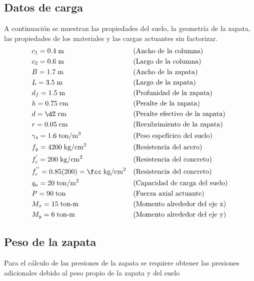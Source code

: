 \documentclass[11pt,a4paper,fleqn]{article}
\begin{document}
\subsection{Datos de carga}
A continuación se muestran las propiedades del suelo, la geometría de la zapata, las propiedades de los materiales y las cargas actuantes sin factorizar.
\begin{align*}
	&c_1=       \caZ    \text{\;m}                && \text{(Ancho de la columna)}\\
	&c_2=       \cbZ    \text{\;m}                && \text{(Largo de la columna)}\\
	&B=         \bZ     \text{\;m}                && \text{(Ancho de la zapata)}\\
	&L=         \lZ     \text{\;m}                && \text{(Largo de la zapata)}\\
	&d_f=       \dfZ    \text{\;m}                && \text{(Profunidad de la zapata)}\\
	&h=         \hZ     \text{\;cm}               && \text{(Peralte de la zapata)}\\
	&d=         \dZ     \text{\;cm}               && \text{(Peralte efectivo de la zapata)}\\
	&r=         \rZ     \text{\;cm}               && \text{(Recubrimiento de la zapata)}\\
	&\gamma_s=  \gammaS \text{\;ton/m$^3$}        && \text{(Peso espefícico del suelo)}\\
	&f_y=       \fy     \text{\;kg/cm$^2$}        && \text{(Resistencia del acero)}\\
	&f^{'}_c=   \fc     \text{\;kg/cm$^2$}        && \text{(Resistencia del concreto)}\\
	&f^{''}_c=  0.85(\fc)=\fcc\text{\;kg/cm$^2$}  && \text{(Resistencia del concreto)}\\
	&q_a=       \qaS    \text{\;ton/m$^2$}        && \text{(Capacidad de carga del suelo)}\\
	&P=         \pZ     \text{\;ton}              && \text{(Fuerza axial actuante)} \\
	&M_{x}=     \mxZ    \text{\;ton-m}            && \text{(Momento alrededor del eje x)}\\
	&M_{y}=     \myZ    \text{\;ton-m}            && \text{(Momento alrededor del eje y)}	
\end{align*}

\subsection{Peso de la zapata}
Para el cálculo de las presiones de la zapata se requiere obtener las presiones adicionales debido al peso propio de la zapata y del suelo
\end{document}
